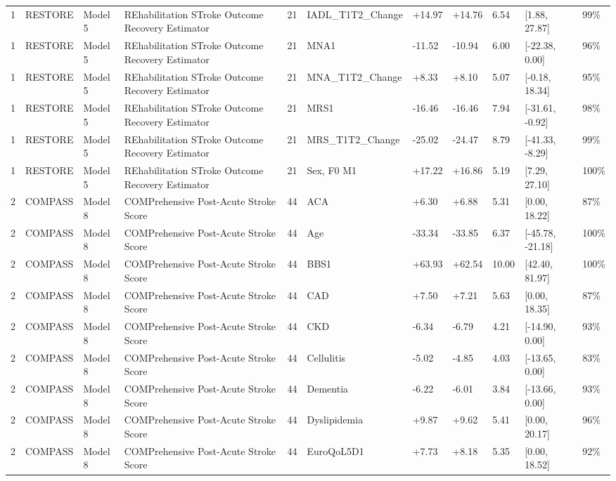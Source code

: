 \begin{tabular}{lllllllllll}
1 & RESTORE & Model 5 & REhabilitation STroke Outcome Recovery Estimator & 21 & IADL\_T1T2\_Change & +14.97 & +14.76 & 6.54 & [1.88, 27.87] & 99\% \\
1 & RESTORE & Model 5 & REhabilitation STroke Outcome Recovery Estimator & 21 & MNA1 & -11.52 & -10.94 & 6.00 & [-22.38, 0.00] & 96\% \\
1 & RESTORE & Model 5 & REhabilitation STroke Outcome Recovery Estimator & 21 & MNA\_T1T2\_Change & +8.33 & +8.10 & 5.07 & [-0.18, 18.34] & 95\% \\
1 & RESTORE & Model 5 & REhabilitation STroke Outcome Recovery Estimator & 21 & MRS1 & -16.46 & -16.46 & 7.94 & [-31.61, -0.92] & 98\% \\
1 & RESTORE & Model 5 & REhabilitation STroke Outcome Recovery Estimator & 21 & MRS\_T1T2\_Change & -25.02 & -24.47 & 8.79 & [-41.33, -8.29] & 99\% \\
1 & RESTORE & Model 5 & REhabilitation STroke Outcome Recovery Estimator & 21 & Sex, F0 M1 & +17.22 & +16.86 & 5.19 & [7.29, 27.10] & 100\% \\
2 & COMPASS & Model 8 & COMPrehensive Post-Acute Stroke Score & 44 & ACA & +6.30 & +6.88 & 5.31 & [0.00, 18.22] & 87\% \\
2 & COMPASS & Model 8 & COMPrehensive Post-Acute Stroke Score & 44 & Age & -33.34 & -33.85 & 6.37 & [-45.78, -21.18] & 100\% \\
2 & COMPASS & Model 8 & COMPrehensive Post-Acute Stroke Score & 44 & BBS1 & +63.93 & +62.54 & 10.00 & [42.40, 81.97] & 100\% \\
2 & COMPASS & Model 8 & COMPrehensive Post-Acute Stroke Score & 44 & CAD & +7.50 & +7.21 & 5.63 & [0.00, 18.35] & 87\% \\
2 & COMPASS & Model 8 & COMPrehensive Post-Acute Stroke Score & 44 & CKD & -6.34 & -6.79 & 4.21 & [-14.90, 0.00] & 93\% \\
2 & COMPASS & Model 8 & COMPrehensive Post-Acute Stroke Score & 44 & Cellulitis & -5.02 & -4.85 & 4.03 & [-13.65, 0.00] & 83\% \\
2 & COMPASS & Model 8 & COMPrehensive Post-Acute Stroke Score & 44 & Dementia & -6.22 & -6.01 & 3.84 & [-13.66, 0.00] & 93\% \\
2 & COMPASS & Model 8 & COMPrehensive Post-Acute Stroke Score & 44 & Dyslipidemia & +9.87 & +9.62 & 5.41 & [0.00, 20.17] & 96\% \\
2 & COMPASS & Model 8 & COMPrehensive Post-Acute Stroke Score & 44 & EuroQoL5D1 & +7.73 & +8.18 & 5.35 & [0.00, 18.52] & 92\% \\

\end{tabular}

